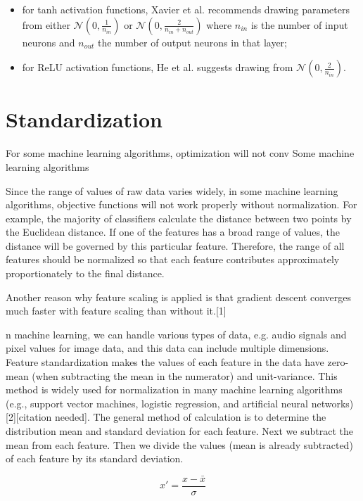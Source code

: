 \begin{itemize}
    \item for tanh activation functions, Xavier et al.\cite{xavierinit} recommends drawing parameters from either $\mathcal{N}(0, \frac{1}{n_{in}})$ or $\mathcal{N}(0, \frac{2}{n_{in}+n_{out}})$ where $n_{in}$ is the number of input neurons and $n_{out}$ the number of output neurons in that layer;
    \item for ReLU activation functions, He et al.\cite{heinit} suggests drawing from $\mathcal{N}(0, \frac{2}{n_{in}})$.
\end{itemize}

\section{Standardization}

For some machine learning algorithms, optimization will not conv
Some machine learning algorithms

Since the range of values of raw data varies widely, in some machine learning algorithms, objective functions will not work properly without normalization. For example, the majority of classifiers calculate the distance between two points by the Euclidean distance. If one of the features has a broad range of values, the distance will be governed by this particular feature. Therefore, the range of all features should be normalized so that each feature contributes approximately proportionately to the final distance.

Another reason why feature scaling is applied is that gradient descent converges much faster with feature scaling than without it.[1]

n machine learning, we can handle various types of data, e.g. audio signals and pixel values for image data, and this data can include multiple dimensions. Feature standardization makes the values of each feature in the data have zero-mean (when subtracting the mean in the numerator) and unit-variance. This method is widely used for normalization in many machine learning algorithms (e.g., support vector machines, logistic regression, and artificial neural networks)[2][citation needed]. The general method of calculation is to determine the distribution mean and standard deviation for each feature. Next we subtract the mean from each feature. Then we divide the values (mean is already subtracted) of each feature by its standard deviation.

$$
x' = \frac{x - \bar{x}}{\sigma}
$$

